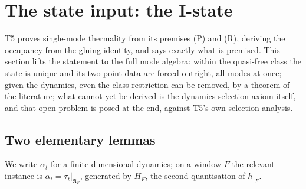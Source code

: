 \documentclass[11pt]{article}
\theoremstyle{definition}
\theoremstyle{plain}
\begin{document}
\section{The state input: the I-state}

\label{c:note.hawking.setting-state-input-i-state}
T5 proves single-mode thermality from its premises (P) and (R), deriving the occupancy from the gluing identity, and says exactly what is premised. This section lifts the statement to the full mode algebra: within the quasi-free class the state is unique and its two-point data are forced outright, all modes at once; given the dynamics, even the class restriction can be removed, by a theorem of the literature; what cannot yet be derived is the dynamics-selection axiom itself, and that open problem is posed at the end, against T5's own selection analysis.

\subsection*{Two elementary lemmas}
\label{c:note.hawking.setting-two-elementary-lemmas}
We write $\alpha_t$ for a finite-dimensional dynamics; on a window $F$ the relevant instance is $\alpha_t = \tau_t|_{\mathfrak{A}_F}$, generated by $H_F$, the second quantisation of $h|_F$.
\end{document}
